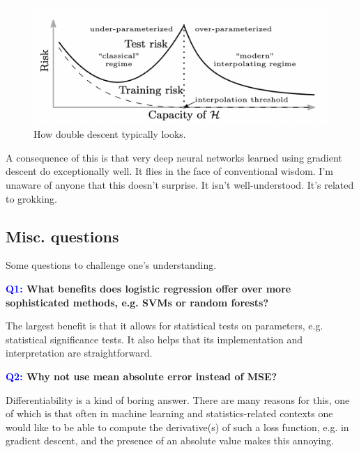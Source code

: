 \documentclass[11pt]{article}
\begin{document}
\begin{figure}[t]
    \centering
    \includegraphics[width=\columnwidth]{./figures/supervised_learning/double_descent.png}
    \caption{How double descent typically looks. }
    \label{fig:double_descent}
\end{figure}

A consequence of this is that very deep neural networks learned using gradient descent do exceptionally well. It flies in the face of conventional wisdom. I'm unaware of anyone that this doesn't surprise. It isn't well-understood. It's related to grokking.

\subsection{Misc. questions}

Some questions to challenge one's understanding.

\begin{center}
    \textbf{\textcolor{blue}{Q1:} What benefits does logistic regression offer over more sophisticated methods, e.g. SVMs or random forests?}
\end{center}
The largest benefit is that it allows for statistical tests on parameters, e.g. statistical significance tests. It also helps that its implementation and interpretation are straightforward.

\begin{center}
    \textbf{\textcolor{blue}{Q2:} Why not use mean absolute error instead of MSE?}
\end{center}

Differentiability is a kind of boring answer. There are many reasons for this, one of which is that often in machine learning and statistics-related contexts one would like to be able to compute the derivative(s) of such a loss function, e.g. in gradient descent, and the presence of an absolute value makes this annoying.
\end{document}
